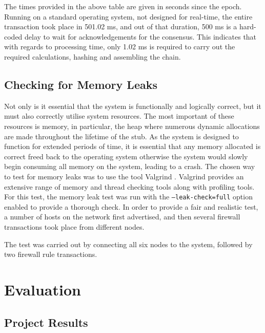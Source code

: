 \documentclass[a4paper, 11pt]{report}
\begin{document}
The times provided in the above table are given in seconds since the epoch. Running on a standard operating system, not designed for real-time, the entire transaction took place in 501.02 ms, and out of that duration, 500 ms is a hard-coded delay to wait for acknowledgements for the consensus. This indicates that with regards to processing time, only 1.02 ms is required to carry out the required calculations, \gls{hashing} and assembling the chain.

\section{Checking for Memory Leaks}
Not only is it essential that the system is functionally and logically correct, but it must also correctly utilise system resources. The most important of these resources is memory, in particular, the heap where numerous dynamic allocations are made throughout the lifetime of the \gls{stub}. As the system is designed to function for extended periods of time, it is essential that any memory allocated is correct freed back to the operating system otherwise the system would slowly begin consuming all memory on the system, leading to a crash.
The chosen way to test for memory leaks was to use the tool Valgrind \cite{valgrind}. Valgrind provides an extensive range of memory and thread checking tools along with profiling tools. For this test, the memory leak test was run with the \texttt{--leak-check=full} option enabled to provide a thorough check. In order to provide a fair and realistic test, a number of hosts on the network first advertised, and then several firewall transactions took place from different nodes. 

The test was carried out by connecting all six nodes to the system, followed by two firewall rule transactions. 
\chapter{Evaluation}

\section{Project Results}
\end{document}
